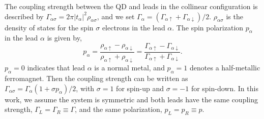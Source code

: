 \documentclass[aps,prb,twocolumn,footinbib,showpacs,superscriptaddress,preprintnumbers,amsmath,amssymb]{revtex4-1}
\begin{document}
The coupling strength between the QD and leads in the collinear configuration is described by $\Gamma_{\alpha\sigma} =2\pi |t_{\alpha}|^2\rho_{\alpha\sigma}$, and we set $\Gamma_\alpha = (\Gamma_{\alpha\uparrow}+\Gamma_{\alpha\downarrow})/2$. $\rho_{\alpha\sigma}$ is the density of states for the spin $\sigma$ electrons in the lead $\alpha$. The spin polarization $p_\alpha$ in the lead $\alpha$ is given by,
\begin{equation}
p_\alpha= \frac{\rho_{\alpha\uparrow}-\rho_{\alpha\downarrow}}{\rho_{\alpha\uparrow}+\rho_{\alpha\downarrow}} = \frac{\Gamma_{\alpha\uparrow}-\Gamma_{\alpha\downarrow}}{\Gamma_{\alpha\uparrow}+\Gamma_{\alpha\downarrow}}.
\end{equation}
$p_\alpha= 0$ indicates that lead $\alpha$ is a normal metal, and $p_\alpha= 1$ denotes a half-metallic ferromagnet.
Then the coupling strength can be written as $\Gamma_{\alpha\sigma}=\Gamma_\alpha (1+\sigma p_\alpha)/2$, with $\sigma=1$ for spin-up and $\sigma=-1$ for spin-down.
In this work, we assume the system is symmetric and both leads have the same coupling strength, $\Gamma_L=\Gamma_R\equiv \Gamma$, and the same polarization, $p_L=p_R \equiv p$.
\end{document}
